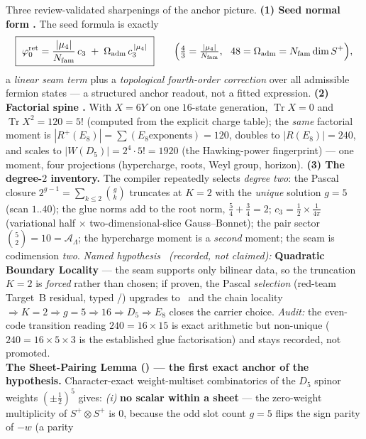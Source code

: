 \documentclass[11pt,a4paper]{article}
\newcommand{\Nfam}{N_{\mathrm{fam}}}
\newcommand{\Oadm}{\Omega_{\mathrm{adm}}}
\newcommand{\cthree}{c_3}
\newcommand{\phiz}{\varphi_0^{\mathrm{ret}}}
\newcommand{\AL}{\mathcal A_\Lambda}
\theoremstyle{definition}
\begin{document}
\begin{keybox}
Three review-validated sharpenings of the anchor picture. \textbf{(1) Seed normal form \mE.} The seed
formula is exactly
\[
  \boxed{\ \phiz=\frac{|\mu_4|}{\Nfam}\,\cthree\;+\;\Oadm\,\cthree^{\,|\mu_4|}\ }
  \qquad\Bigl(\tfrac43=\tfrac{|\mu_4|}{\Nfam},\ \ 48=\Oadm=\Nfam\dim S^+\Bigr),
\]
a \emph{linear seam term} plus a \emph{topological fourth-order correction} over all admissible fermion
states --- a structured anchor readout, not a fitted expression. \textbf{(2) Factorial spine \mE.} With
$X=6Y$ on one $16$-state generation, $\operatorname{Tr}X=0$ and $\operatorname{Tr}X^2=120=5!$ (computed
from the explicit charge table); the \emph{same} factorial moment is $|R^+(E_8)|=\sum(\text{$E_8$
exponents})=120$, doubles to $|R(E_8)|=240$, and scales to $|W(D_5)|=2^4\cdot5!=1920$ (the Hawking-power
fingerprint) --- one moment, four projections (hypercharge, roots, Weyl group, horizon). \textbf{(3) The
degree-$2$ inventory.} The compiler repeatedly selects \emph{degree two}: the Pascal closure
$2^{g-1}=\sum_{k\le2}\binom gk$ truncates at $K{=}2$ with the \emph{unique} solution $g=5$ (scan
$1..40$); the glue norms add to the root norm, $\tfrac54+\tfrac34=2$; $\cthree=\tfrac12\times\tfrac1{4\pi}$
(variational half $\times$ two-dimensional-slice Gauss--Bonnet); the pair sector $\binom52=10=\AL$; the
hypercharge moment is a \emph{second} moment; the seam is codimension \emph{two}. \emph{Named hypothesis
\mC\ (recorded, not claimed):} \textbf{Quadratic Boundary Locality} --- the seam supports only bilinear
data, so the truncation $K=2$ is \emph{forced} rather than chosen; if proven, the Pascal \emph{selection}
(red-team Target~B residual, typed \mO/\mC) upgrades to \mE\ and the chain locality $\Rightarrow K{=}2
\Rightarrow g{=}5\Rightarrow16\Rightarrow D_5\Rightarrow E_8$ closes the carrier choice. \emph{Audit:}
the even-code transition reading $240=16\times15$ is exact arithmetic but non-unique ($240=16\times5\times3$
is the established glue factorisation) and stays recorded, not promoted.
\smallskip\\
\noindent\textbf{The Sheet-Pairing Lemma () --- the first exact anchor of
the hypothesis.} Character-exact weight-multiset combinatorics of the $D_5$ spinor weights
$(\pm\tfrac12)^5$ gives: \emph{(i)} \textbf{no scalar within a sheet} --- the zero-weight multiplicity of
$S^+\!\otimes S^+$ is $0$, because the odd slot count $g=5$ flips the sign parity of $-w$ (a parity

\end{keybox}
\end{document}
